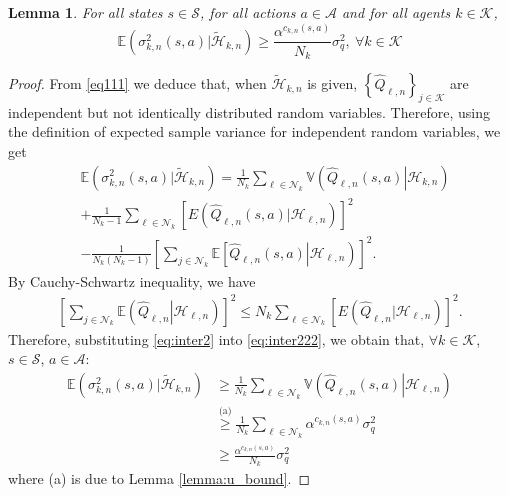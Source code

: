 \documentclass[lettersize,journal]{IEEEtran}
\newtheorem{lemma}{Lemma}
\begin{document}
\begin{appendices}
\begin{lemma}
\label{lemma3}
For all states $s\in \mathcal{S}$, for all actions  $a\in \mathcal{A}$ and for all agents $k \in \mathcal{K}$, 
\begin{equation}
 \mathbb{E}(\sigma_{k,n}^2(s,a)|\widetilde{\mathcal{H}}_{k,n})\geq \frac{\alpha^{c_{k,n}(s,a)}}{N_k}  \sigma_q^2, \ \forall k\in \mathcal{K}
\end{equation}
\end{lemma}
\begin{proof}
 From \eqref{eq111}  we deduce that, when $\widetilde{\mathcal{H}}_{k,n}$ is given, $\left\{ \widehat{Q}_{\ell,n} \right\}_{j\in \mathcal{K}}$ are independent but not identically distributed random variables. Therefore, using the definition of expected sample variance for independent random variables, we get 
 \begin{align}
 \label{eq:inter222}
    & \mathbb{E}(\sigma_{k,n}^2(s,a)|\widetilde{\mathcal{H}}_{k,n})=\frac{1}{N_{k}}\sum\limits_{\ell\in \mathcal{N}_k}\mathbb{V}\left(\widehat{Q}_{\ell,n}(s,a)\left.\right|\mathcal{H}_{k,n}\right)\nonumber \\
    & +\frac{1}{N_k-1}\sum\limits_{\ell\in\mathcal{N}_k}\left[E(\widehat{Q}_{\ell,n}(s,a)|\mathcal{H}_{\ell,n})\right]^2\nonumber\\
    &-\frac{1}{N_k(N_k-1)}\left[\sum\limits_{j\in \mathcal{N}_{k}}\mathbb{E}\left[\left.\widehat{Q}_{\ell,n}(s,a)\right|\mathcal{H}_{\ell,n}\right)\right]^2.
 \end{align}
 By Cauchy-Schwartz inequality, we have 
\begin{align}
\label{eq:inter2}
    \left[\sum\limits_{j\in \mathcal{N}_{k}}\mathbb{E}\left(\left.\widehat{Q}_{\ell,n}\right|\mathcal{H}_{\ell,n}\right)\right]^2\leq N_k\sum\limits_{\ell\in\mathcal{N}_k}\left[E(\widehat{Q}_{\ell,n}|\mathcal{H}_{\ell,n})\right]^2.
\end{align}
Therefore, substituting \eqref{eq:inter2} into \eqref{eq:inter222}, we obtain that,   $\forall k \in \mathcal{K}$, $s\in\mathcal{S}$, $a\in\mathcal{A}$:
\begin{align}
    \mathbb{E}(\sigma_{k,n}^2(s,a)|\widetilde{\mathcal{H}}_{k,n})&\geq\frac{1}{N_{k}}\sum\limits_{\ell\in \mathcal{N}_k}\mathbb{V}\left(\widehat{Q}_{\ell,n}(s,a)\left.\right|\mathcal{H}_{\ell,n}\right)\nonumber \\
    &\stackrel{\text{(a)}}{\geq}\frac{1}{N_{k}}\sum\limits_{\ell\in \mathcal{N}_k} \alpha^{c_{k,n}(s,a)}  \sigma_q^2  \nonumber\\
    & \geq\frac{\alpha^{c_{k,n}(s,a)}}{N_k}  \sigma_q^2
\end{align}
where (a) is due to Lemma \ref{lemma:u_bound}.
\end{proof}


\end{appendices}
\end{document}
